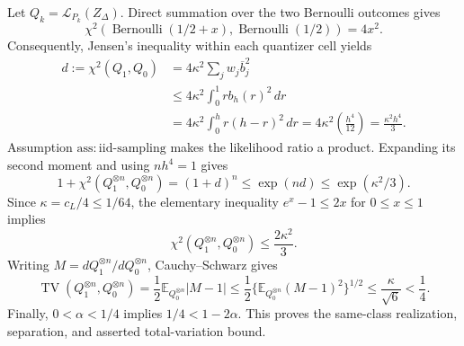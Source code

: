 Let \(Q_k=\mathcal L_{P_k}(Z_\Delta)\).  Direct summation over the two Bernoulli outcomes gives
\[
 \chi^2\!\left(\operatorname{Bernoulli}(1/2+x),
                    \operatorname{Bernoulli}(1/2)\right)=4x^2.
\]
Consequently, Jensen's inequality within each quantizer cell yields
\[
 \begin{aligned}
 d:=\chi^2(Q_1,Q_0)
 &=4\kappa^2\sum_jw_j\overline b_j^2\\
 &\leq4\kappa^2\int_0^1rb_h(r)^2\,dr\\
 &=4\kappa^2\int_0^h r(h-r)^2\,dr
 =4\kappa^2\left(\frac{h^4}{12}\right)
 =\frac{\kappa^2h^4}{3}.
 \end{aligned}
\]
Assumption \(\mathrm{ass:iid\text{-}sampling}\) makes the likelihood ratio a product.  Expanding its second moment and using \(nh^4=1\) gives
\[
 1+\chi^2(Q_1^{\otimes n},Q_0^{\otimes n})
 =(1+d)^n
 \leq\exp(nd)
 \leq\exp(\kappa^2/3).
\]
Since \(\kappa=c_L/4\leq1/64\), the elementary inequality \(e^x-1\leq2x\) for \(0\leq x\leq1\) implies
\[
 \chi^2(Q_1^{\otimes n},Q_0^{\otimes n})
 \leq\frac{2\kappa^2}{3}.
\]
Writing \(M=dQ_1^{\otimes n}/dQ_0^{\otimes n}\), Cauchy--Schwarz gives
\[
 \operatorname{TV}(Q_1^{\otimes n},Q_0^{\otimes n})
 =\frac12\mathbb E_{Q_0^{\otimes n}}|M-1|
 \leq\frac12\{\mathbb E_{Q_0^{\otimes n}}(M-1)^2\}^{1/2}
 \leq\frac{\kappa}{\sqrt6}<\frac14.
\]
Finally, \(0<\alpha<1/4\) implies \(1/4<1-2\alpha\).  This proves the same-class realization, separation, and asserted total-variation bound.